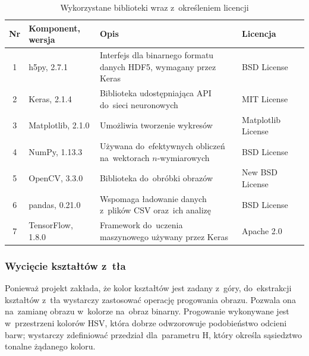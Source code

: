 \documentclass[11pt,a4paper]{article}
\begin{document}
\begin{table}[H]
    \begin{tabularx}{\textwidth}{|c|l|X|l|c|}
        \hline
        \textbf{Nr} & \textbf{Komponent, wersja} & \textbf{Opis} & \textbf{Licencja} & \\
        \hline
        \hline
        1 &
        h5py, 2.7.1 &
        Interfejs dla binarnego formatu danych HDF5, wymagany przez Keras &
        BSD License &
        \cite{h5py} \\
        \hline
        2 &
        Keras, 2.1.4 &
        Biblioteka udostępniająca API do~sieci neuronowych &
        MIT License &
        \cite{keras} \\
        \hline
        3 & 
        Matplotlib, 2.1.0 & 
        Umożliwia tworzenie wykresów &
        Matplotlib License &
        \cite{matplotlib} \\
        \hline
        4 & 
        NumPy, 1.13.3 &
        Używana do~efektywnych obliczeń na~wektorach $n$-wymiarowych &
        BSD License &
        \cite{numpy} \\
        \hline
        5 & 
        OpenCV, 3.3.0 &
        Biblioteka do~obróbki obrazów &
        New BSD License &
        \cite{opencv} \\
        \hline
        6 &
        pandas, 0.21.0 &
        Wspomaga ładowanie danych z~plików CSV oraz~ich analizę &
        BSD License &
        \cite{pandas} \\
        \hline
        7 &
        TensorFlow, 1.8.0 &
        Framework do~uczenia maszynowego używany przez Keras &
        Apache 2.0 &
        \cite{tensorflow} \\
        \hline
    \end{tabularx}
    \caption{Wykorzystane biblioteki wraz z~określeniem licencji}
    \label{tbl:libraries}
\end{table}

\subsubsection{Wycięcie kształtów z~tła}

Ponieważ projekt zakłada, że kolor kształtów jest zadany z~góry, do~ekstrakcji kształtów z~tła wystarczy zastosować operację progowania obrazu.
Pozwala ona na~zamianę obrazu w~kolorze na~obraz binarny.
Progowanie wykonywane jest w~przestrzeni kolorów HSV, która dobrze odwzorowuje podobieństwo odcieni barw; wystarczy zdefiniować przedział dla~parametru H, który określa sąsiedztwo tonalne żądanego koloru.
\end{document}
